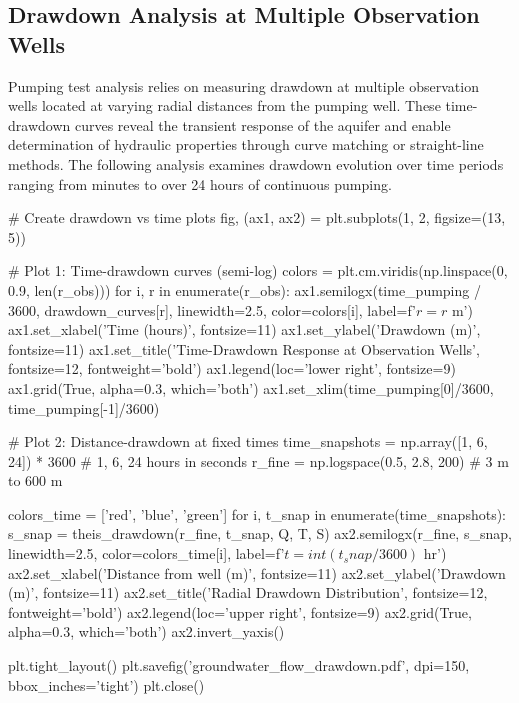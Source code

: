 \documentclass[a4paper, 11pt]{article}
\begin{document}
\subsection{Drawdown Analysis at Multiple Observation Wells}

Pumping test analysis relies on measuring drawdown at multiple observation wells located at
varying radial distances from the pumping well. These time-drawdown curves reveal the transient
response of the aquifer and enable determination of hydraulic properties through curve matching
or straight-line methods. The following analysis examines drawdown evolution over time periods
ranging from minutes to over 24 hours of continuous pumping.

\begin{pycode}
# Create drawdown vs time plots
fig, (ax1, ax2) = plt.subplots(1, 2, figsize=(13, 5))

# Plot 1: Time-drawdown curves (semi-log)
colors = plt.cm.viridis(np.linspace(0, 0.9, len(r_obs)))
for i, r in enumerate(r_obs):
    ax1.semilogx(time_pumping / 3600, drawdown_curves[r],
                 linewidth=2.5, color=colors[i], label=f'$r = {r}$ m')
ax1.set_xlabel('Time (hours)', fontsize=11)
ax1.set_ylabel('Drawdown (m)', fontsize=11)
ax1.set_title('Time-Drawdown Response at Observation Wells', fontsize=12, fontweight='bold')
ax1.legend(loc='lower right', fontsize=9)
ax1.grid(True, alpha=0.3, which='both')
ax1.set_xlim(time_pumping[0]/3600, time_pumping[-1]/3600)

# Plot 2: Distance-drawdown at fixed times
time_snapshots = np.array([1, 6, 24]) * 3600  # 1, 6, 24 hours in seconds
r_fine = np.logspace(0.5, 2.8, 200)  # 3 m to 600 m

colors_time = ['red', 'blue', 'green']
for i, t_snap in enumerate(time_snapshots):
    s_snap = theis_drawdown(r_fine, t_snap, Q, T, S)
    ax2.semilogx(r_fine, s_snap, linewidth=2.5, color=colors_time[i],
                 label=f'$t = {int(t_snap/3600)}$ hr')
ax2.set_xlabel('Distance from well (m)', fontsize=11)
ax2.set_ylabel('Drawdown (m)', fontsize=11)
ax2.set_title('Radial Drawdown Distribution', fontsize=12, fontweight='bold')
ax2.legend(loc='upper right', fontsize=9)
ax2.grid(True, alpha=0.3, which='both')
ax2.invert_yaxis()

plt.tight_layout()
plt.savefig('groundwater_flow_drawdown.pdf', dpi=150, bbox_inches='tight')
plt.close()
\end{pycode}
\end{document}
